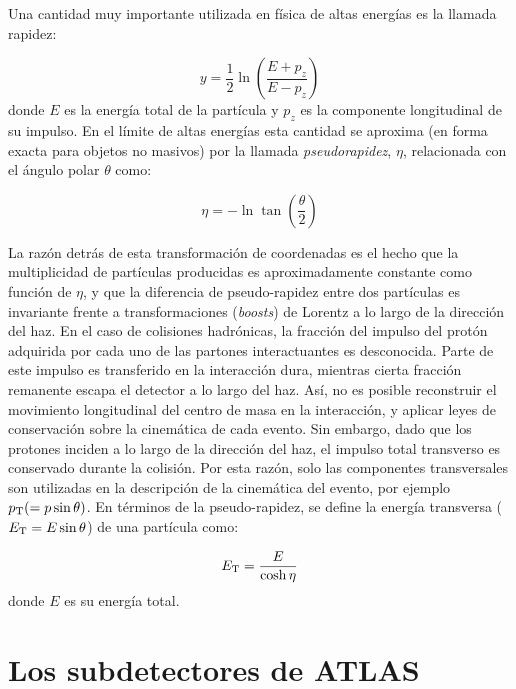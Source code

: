 Una cantidad muy importante utilizada en física de altas energías es la
llamada rapidez:

\begin{equation}
  y = \frac{1}{2} \ln \left( \frac{E+p_z}{E-p_z} \right)
\end{equation}
%
donde $E$ es la energía total de la partícula y $p_z$ es la componente
longitudinal de su impulso. En el límite de altas energías esta cantidad se
aproxima (en forma exacta para objetos no masivos) por la llamada
\emph{pseudorapidez}, $\eta$, relacionada con el ángulo polar $\theta$ como:

\begin{equation}
  \eta = - \ln \tan \left( \frac{\theta}{2} \right)
\end{equation}

La razón detrás de esta transformación de coordenadas es el hecho que la
multiplicidad de partículas producidas es aproximadamente constante como función
de $\eta$, y que la diferencia de pseudo-rapidez entre dos partículas es
invariante frente a transformaciones (\emph{boosts}) de Lorentz a lo largo de la
dirección del haz. En el caso de colisiones hadrónicas, la fracción del impulso
del protón adquirida por cada uno de las partones interactuantes es desconocida.
Parte de este impulso es transferido en la interacción dura, mientras cierta
fracción remanente escapa el detector a lo largo del haz. Así, no es posible
reconstruir el movimiento longitudinal del centro de masa en la interacción, y
aplicar leyes de conservación sobre la cinemática de cada evento. Sin embargo,
dado que los protones inciden a lo largo de la dirección del haz, el impulso
total transverso es conservado durante la colisión. Por esta razón, solo las
componentes transversales son utilizadas en la descripción de la cinemática del
evento, por ejemplo $p_{\mathrm{T}} (= p \sin \theta)$. En términos de
la pseudo-rapidez, se define la energía transversa ($E_{\mathrm{T}} = E \sin \theta$) de una partícula como:


\begin{equation}
  \et = \frac{E}{\cosh \eta}
\end{equation}
%
donde $E$ es su energía total.


\section{Los subdetectores de ATLAS}


